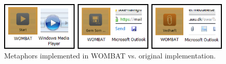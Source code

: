 \begin{figure}[H]
	\centering
		\includegraphics[width=\textwidth]{Images/Implementation/wombat_metaphors.png}
			\caption{Metaphors implemented in WOMBAT vs. original implementation.}
	\label{fig:metaphors}
\end{figure}